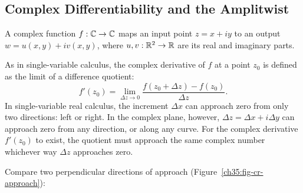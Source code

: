 \subsection{Complex Differentiability and the Amplitwist}

A complex function $f: \mathbb{C} \to \mathbb{C}$ maps an input point $z = x + iy$ to an output $w = u(x,y) + iv(x,y)$, where $u, v: \mathbb{R}^2 \to \mathbb{R}$ are its real and imaginary parts. 

As in single-variable calculus, the complex derivative of $f$ at a point $z_0$ is defined as the limit of a difference quotient:
\begin{equation}
f'(z_0) = \lim_{\Delta z \to 0} \frac{f(z_0 + \Delta z) - f(z_0)}{\Delta z}.
\label{ch35:eq-complex-derivative}
\end{equation}
In single-variable real calculus, the increment $\Delta x$ can approach zero from only two directions: left or right. In the complex plane, however, $\Delta z = \Delta x + i\Delta y$ can approach zero from any direction, or along any curve. For the complex derivative $f'(z_0)$ to exist, the quotient must approach the same complex number whichever way $\Delta z$ approaches zero.

Compare two perpendicular directions of approach (Figure~\ref{ch35:fig-cr-approach}):

